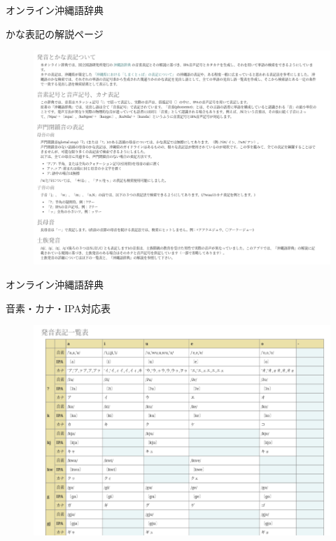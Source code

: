 \documentclass[14pt]{beamer}
\begin{document}
\begin{frame}{オンライン沖縄語辞典}
  \begin{block}{かな表記の解説ページ}
    \begin{figure}[ht]
      \centering
      \includegraphics[height=0.6\paperheight,width=0.7\paperwidth]{okinawago-app-about-pronunciation1.png}
    \end{figure}
  \end{block}
\end{frame}

\begin{frame}{オンライン沖縄語辞典}
  \begin{block}{音素・カナ・IPA対応表}
    \begin{figure}[ht]
      \centering
      \includegraphics[height=0.6\paperheight,width=0.7\paperwidth]{okinawago-app-about-pronunciation2.png}
    \end{figure}
  \end{block}
\end{frame}
\end{document}
